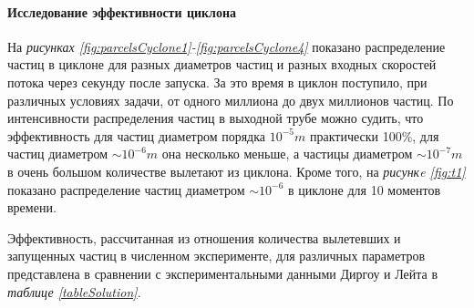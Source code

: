 \paragraph{Исследование эффективности циклона\\}

На \textit{рисунках \ref{fig:parcelsCyclone1}-\ref{fig:parcelsCyclone4}} показано распределение частиц в циклоне для разных диаметров частиц и разных входных скоростей потока через секунду после запуска. За это время в циклон поступило, при различных условиях задачи, от одного миллиона до двух миллионов частиц. По интенсивности распределения частиц в выходной трубе можно судить, что эффективность для частиц диаметром порядка $10^{-5}m$ практически 100\%, для частиц диаметром $\sim 10^{-6}m$ она несколько меньше, а частицы диаметром $\sim 10^{-7}m$ в очень большом количестве вылетают из циклона. Кроме того, на \textit{рисункe \ref{fig:t1}} показано распределение частиц диаметром $\sim 10^{-6}$ в циклоне для 10 моментов времени.

Эффективность, рассчитанная из отношения количества вылетевших и запущенных частиц в численном эксперименте, для различных параметров представлена в сравнении с экспериментальными данными Диргоу и Лейта \cite{DirgoLeith} в \textit{таблице \ref{tableSolution}}.


